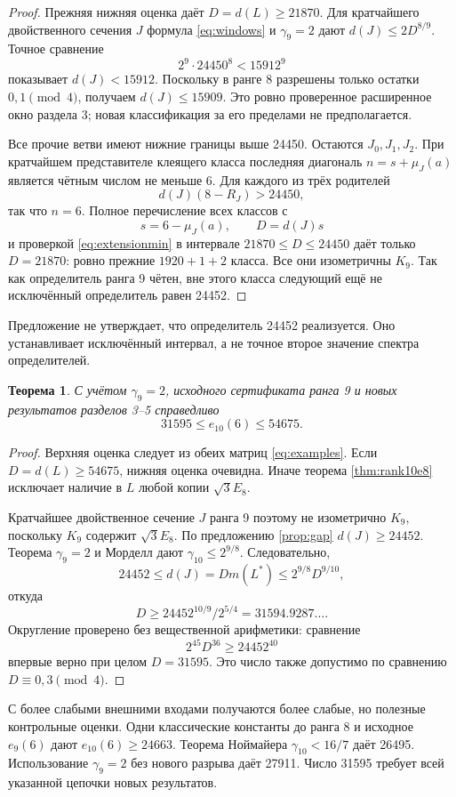 \documentclass[11pt,a4paper]{article}
\newtheorem{theorem}{Теорема}[section]
\theoremstyle{remark}\newtheorem{remark}[theorem]{Замечание}
\begin{document}
\begin{proof}
Прежняя нижняя оценка даёт $D=d(L)\ge21870$. Для кратчайшего двойственного сечения $J$ формула \eqref{eq:windows} и $\gamma_9=2$ дают $d(J)\le2D^{8/9}$. Точное сравнение
\[
2^9\cdot24450^8<15912^9
\]
показывает $d(J)<15912$. Поскольку в ранге 8 разрешены только остатки $0,1\pmod4$, получаем $d(J)\le15909$. Это ровно проверенное расширенное окно раздела 3; новая классификация за его пределами не предполагается.

Все прочие ветви имеют нижние границы выше 24450. Остаются $J_0,J_1,J_2$. При кратчайшем представителе клеящего класса последняя диагональ $n=s+\mu_J(a)$ является чётным числом не меньше 6. Для каждого из трёх родителей
\[
d(J)(8-R_J)>24450,
\]
так что $n=6$. Полное перечисление всех классов с
\[
s=6-\mu_J(a),\qquad D=d(J)s
\]
и проверкой \eqref{eq:extensionmin} в интервале $21870\le D\le24450$ даёт только $D=21870$: ровно прежние $1920+1+2$ класса. Все они изометричны $K_9$. Так как определитель ранга 9 чётен, вне этого класса следующий ещё не исключённый определитель равен 24452.
\end{proof}

Предложение не утверждает, что определитель 24452 реализуется. Оно устанавливает исключённый интервал, а не точное второе значение спектра определителей.

\begin{theorem}\label{thm:global10}
С учётом $\gamma_9=2$, исходного сертификата ранга 9 и новых результатов разделов 3--5 справедливо
\[
\boxed{31595\le e_{10}(6)\le54675}.
\]
\end{theorem}

\begin{proof}
Верхняя оценка следует из обеих матриц \eqref{eq:examples}. Если $D=d(L)\ge54675$, нижняя оценка очевидна. Иначе теорема \ref{thm:rank10e8} исключает наличие в $L$ любой копии $\sqrt3E_8$.

Кратчайшее двойственное сечение $J$ ранга 9 поэтому не изометрично $K_9$, поскольку $K_9$ содержит $\sqrt3E_8$. По предложению \ref{prop:gap} $d(J)\ge24452$. Теорема $\gamma_9=2$ и Морделл дают $\gamma_{10}\le2^{9/8}$. Следовательно,
\[
24452\le d(J)=D m(L^*)\le2^{9/8}D^{9/10},
\]
откуда
\[
D\ge24452^{10/9}/2^{5/4}=31594.9287\ldots.
\]
Округление проверено без вещественной арифметики: сравнение
\[
2^{45}D^{36}\ge24452^{40}
\]
впервые верно при целом $D=31595$. Это число также допустимо по сравнению $D\equiv0,3\pmod4$.
\end{proof}

С более слабыми внешними входами получаются более слабые, но полезные контрольные оценки. Одни классические константы до ранга 8 и исходное $e_9(6)$ дают $e_{10}(6)\ge24663$. Теорема Ноймайера $\gamma_{10}<16/7$ \cite{neumaier} даёт 26495. Использование $\gamma_9=2$ без нового разрыва даёт 27911. Число 31595 требует всей указанной цепочки новых результатов.
\end{document}
